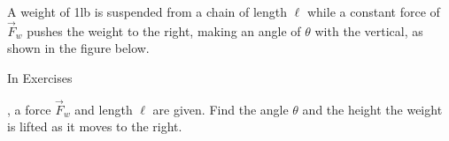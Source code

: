 {\noindent A weight of 1lb is suspended from a chain of length $\ell$ while a constant force of $\vec F_w$ pushes the weight to the right, making an angle of $\theta$ with the vertical, as shown in the figure below. 
\begin{center}
\end{center}
In Exercises}
{,  a force $\vec F_w$ and length $\ell$ are given. Find the angle $\theta$ and the height the weight is lifted as it moves to the right.
}
